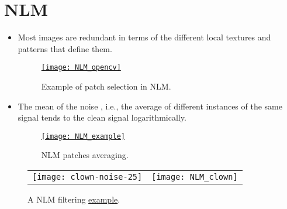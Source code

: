 \section{\gls{NLM} \cite{buades2010image}}
\begin{itemize}
\item Most images are redundant in terms of the different local
  textures and patterns that define them.
  \begin{figure}[H]
    \vspace{2ex}
    \centering
    \href{https://docs.opencv.org/3.4/d5/d69/tutorial_py_non_local_means.html}{\texttt{[image: NLM\_opencv]}}
    \caption{Example of patch selection in \gls{NLM}.}
    \label{fig:NLM_patching}
  \end{figure}
\end{itemize}
  
\begin{itemize}
\item The mean of the noise , i.e.,
  the average of different instances of the same signal tends to the
  clean signal logarithmically.
  \begin{figure}[H]
    \vspace{0ex}
    \centering
    \href{https://www.umbjournal.org/article/S0301-5629(17)30201-6/fulltext}{\texttt{[image: NLM\_example]}}
    \caption{\gls{NLM} patches averaging.}
    \label{fig:NLM_averaging}
  \end{figure}
\end{itemize}

\begin{figure}[H]
  \vspace{0ex}
  \centering
  \begin{tabular}{cc}
    \texttt{[image: clown-noise-25]} & \texttt{[image: NLM\_clown]}
  \end{tabular}
  \caption{A \gls{NLM} filtering \href{https://imagej.net/plugins/non-local-means-denoise/}{example}.}
  \label{fig:NLM_example}
\end{figure}

